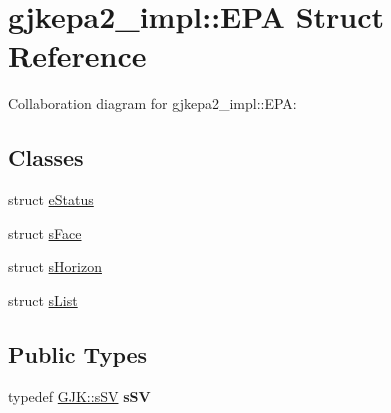 \hypertarget{structgjkepa2__impl_1_1_e_p_a}{\section{gjkepa2\+\_\+impl\+:\+:E\+P\+A Struct Reference}
\label{structgjkepa2__impl_1_1_e_p_a}
}


Collaboration diagram for gjkepa2\+\_\+impl\+:\+:E\+P\+A\+:
\subsection*{Classes}
\begin{DoxyCompactItemize}
\item 
struct \hyperlink{structgjkepa2__impl_1_1_e_p_a_1_1e_status}{e\+Status}
\item 
struct \hyperlink{structgjkepa2__impl_1_1_e_p_a_1_1s_face}{s\+Face}
\item 
struct \hyperlink{structgjkepa2__impl_1_1_e_p_a_1_1s_horizon}{s\+Horizon}
\item 
struct \hyperlink{structgjkepa2__impl_1_1_e_p_a_1_1s_list}{s\+List}
\end{DoxyCompactItemize}
\subsection*{Public Types}
\begin{DoxyCompactItemize}
\item 
\hypertarget{structgjkepa2__impl_1_1_e_p_a_ae68df593da0fe83750ca5d214f3b99e1}{typedef \hyperlink{structgjkepa2__impl_1_1_g_j_k_1_1s_s_v}{G\+J\+K\+::s\+S\+V} {\bfseries s\+S\+V}}\label{structgjkepa2__impl_1_1_e_p_a_ae68df593da0fe83750ca5d214f3b99e1}

\end{DoxyCompactItemize}

